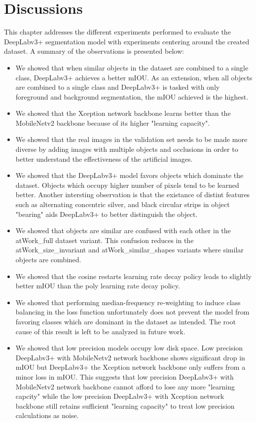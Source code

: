 \section{Discussions}
\label{section:dis}

This chapter addresses the different experiments performed to evaluate the DeepLabv3+ segmentation model with experiments centering around the created dataset. A summary of the observations is presented below:

	\begin{itemize}
		\item We showed that when similar objects in the dataset are combined to a single class, DeepLabv3+ achieves a better mIOU. As an extension, when all objects are combined to a single class and DeepLabv3+ is tasked with only foreground and background segmentation, the mIOU achieved is the highest.
		\item We showed that the Xception network backbone learns better than the MobileNetv2 backbone because of its higher "learning capacity".
		\item We showed that the real images in the validation set needs to be made more diverse by adding images with multiple objects and occlusions in order to better understand the effectiveness of the artificial images.
		\item We showed that the DeepLabv3+ model favors objects which dominate the dataset. Objects which occupy higher number of pixels tend to be learned better. Another intersting observation is that the existance of distint features such as alternating concentric silver, and black circular strips in object "bearing" aids DeepLabv3+ to better distinguish the object.
		\item We showed that objects are similar are confused with each other in the atWork\_full dataset variant. This confusion reduces in the atWork\_size\_invariant and atWork\_similar\_shapes variants where similar objects are combined.
		\item We showed that the cosine restarts learning rate decay policy leads to slightly better mIOU than the poly learning rate decay policy.
		\item We showed that performing median-frequency re-weighting to induce class balancing in the loss function unfortunately does not prevent the model from favoring classes which are dominant in the dataset as intended. The root cause of this result is left to be analyzed in future work.
		\item We showed that low precision models occupy low disk space. Low precision DeepLabv3+ with MobileNetv2 network backbone shows significant drop in mIOU but DeepLabv3+ the Xception network backbone only suffers from a minor loss in mIOU. This suggests that low precision DeepLabv3+ with MobileNetv2 network backbone cannot afford to lose any more "learning capcity" while the low precision DeepLabv3+ with Xception network backbone still retains sufficient "learning capacity" to treat low precision calculations as noise.
	\end{itemize} 

